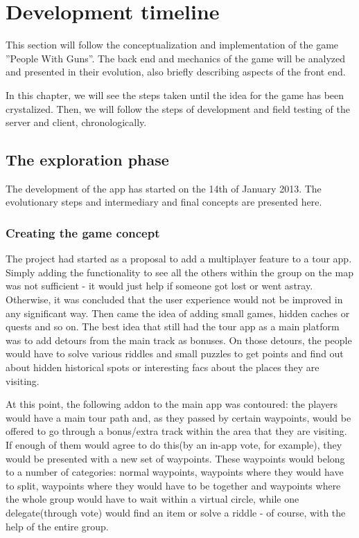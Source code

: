\section{Development timeline}

This section will follow the conceptualization and implementation of
the game ''People With Guns''. The back end and mechanics of the game will be
analyzed and presented in their evolution, also briefly describing aspects of
the front end. \newline

In this chapter, we will see the steps taken until the idea for the game has
been crystalized. Then, we will follow the steps of development and field
testing of the server and client, chronologically.


\subsection{The exploration phase}

The development of the app has started on the 14th of January 2013.
The evolutionary steps and intermediary and final concepts are presented here.\newline

\subsubsection{Creating the game concept}

The project had started as a proposal to add a multiplayer feature to a tour
app. Simply adding the functionality to see all the others within the group on
the map was not sufficient - it would just help if someone got lost or went
astray. Otherwise, it was concluded that the user experience would not be
improved in any significant way. Then came the idea of adding small games,
hidden caches or quests and so on. The best idea that still had the tour app as
a main platform was to add detours from the main track as bonuses. On those
detours, the people would have to solve various riddles and small puzzles to get
points and find out about hidden historical spots or interesting facs about the
places they are visiting. \newline

At this point, the following addon to the main app was contoured: the
players would have a main tour path and, as they passed by certain waypoints,
would be offered to go through a bonus/extra track within the area that they are
visiting. If enough of them would agree to do this(by an in-app vote, for
example), they would be presented with a new set of waypoints. These waypoints
would belong to a number of categories: normal waypoints, waypoints where they
would have to split, waypoints where they would have to be together and
waypoints where the whole group would have to wait within a virtual circle,
while one delegate(through vote) would find an item or solve a riddle -
of course, with the help of the entire group.\newline

